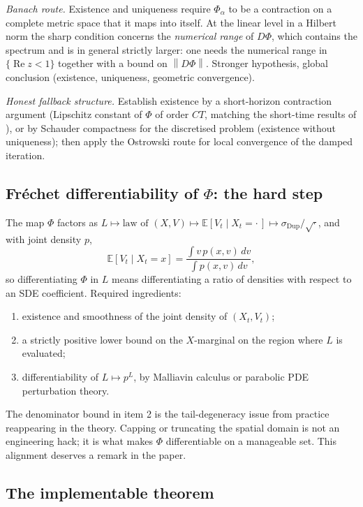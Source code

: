\documentclass[11pt,a4paper]{article}
\theoremstyle{plain}
\theoremstyle{definition}
\theoremstyle{definition}
\newcommand{\E}{\mathbb{E}}
\newcommand{\norm}[1]{\left\lVert #1 \right\rVert}
\newcommand{\sigDup}{\sigma_{\mathrm{Dup}}}
\newcommand{\Lev}{L}
\newcommand{\Phimap}{\Phi}
\newcommand{\Phal}{\Phi_\alpha}
\begin{document}
\emph{Banach route.} Existence and uniqueness require $\Phal$ to be a contraction on a complete metric space that it maps into itself. At the linear level in a Hilbert norm the sharp condition concerns the \emph{numerical range} of $D\Phimap$, which contains the spectrum and is in general strictly larger: one needs the numerical range in $\{\operatorname{Re} z < 1\}$ together with a bound on $\norm{D\Phimap}$. Stronger hypothesis, global conclusion (existence, uniqueness, geometric convergence).

\emph{Honest fallback structure.} Establish existence by a short-horizon contraction argument (Lipschitz constant of $\Phimap$ of order $CT$, matching the short-time results of \citet{abergel2010}), or by Schauder compactness for the discretised problem (existence without uniqueness); then apply the Ostrowski route for local convergence of the damped iteration.

\subsection{Fr\'echet differentiability of $\Phimap$: the hard step}

The map $\Phimap$ factors as $\Lev \mapsto \text{law of } (X, V) \mapsto \E[V_t \mid X_t = \cdot\,] \mapsto \sigDup / \sqrt{\cdot}$, and with joint density $p$,
\[
  \E[V_t \mid X_t = x] = \frac{\int v\, p(x, v)\, dv}{\int p(x, v)\, dv},
\]
so differentiating $\Phimap$ in $\Lev$ means differentiating a ratio of densities with respect to an SDE coefficient. Required ingredients:
\begin{enumerate}
\item existence and smoothness of the joint density of $(X_t, V_t)$;
\item a strictly positive lower bound on the $X$-marginal on the region where $\Lev$ is evaluated;
\item differentiability of $\Lev \mapsto p^{\Lev}$, by Malliavin calculus or parabolic PDE perturbation theory.
\end{enumerate}
The denominator bound in item 2 is the tail-degeneracy issue from practice reappearing in the theory. Capping or truncating the spatial domain is not an engineering hack; it is what makes $\Phimap$ differentiable on a manageable set. This alignment deserves a remark in the paper.

\subsection{The implementable theorem}
\end{document}
